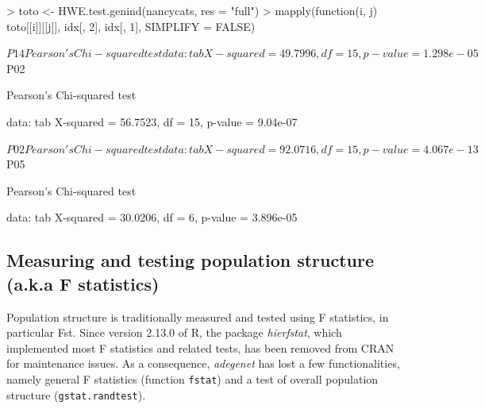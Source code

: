 \documentclass{article}
\begin{document}
\begin{Schunk}
\begin{Sinput}
> toto <- HWE.test.genind(nancycats, res = "full")
> mapply(function(i, j) toto[[i]][[j]], idx[, 2], idx[, 1], SIMPLIFY = FALSE)
\end{Sinput}
\begin{Soutput}
$P14

	Pearson's Chi-squared test

data:  tab 
X-squared = 49.7996, df = 15, p-value = 1.298e-05


$P02

	Pearson's Chi-squared test

data:  tab 
X-squared = 56.7523, df = 15, p-value = 9.04e-07


$P02

	Pearson's Chi-squared test

data:  tab 
X-squared = 92.0716, df = 15, p-value = 4.067e-13


$P05

	Pearson's Chi-squared test

data:  tab 
X-squared = 30.0206, df = 6, p-value = 3.896e-05
\end{Soutput}
\end{Schunk}





\subsection{Measuring and testing population structure (a.k.a F statistics)}
Population structure is traditionally measured and tested using F statistics, in particular Fst.
Since version 2.13.0 of R, the package \emph{hierfstat}, which implemented most F statistics and
related tests, has been removed from CRAN for maintenance issues.
As a consequence, \emph{adegenet} has lost a few functionalities, namely general F statistics
(function \texttt{fstat}) and a test of overall population structure (\texttt{gstat.randtest}).
\\



\end{document}
